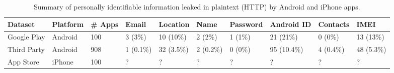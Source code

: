 \begin{table}[t]
    \centering
    \begin{tabular}{l|l|l|l|l|l|l|l|l|l}
       Dataset&Platform&\# Apps&Email&Location&Name&Password&Android ID&Contacts&IMEI\\
       \hline
       \hline
       Google Play&Android&100&3 (3\%)&10 (10\%)&2 (2\%)&1 (1\%)&21 (21\%)&0 (0\%)&13 (13\%)\\
       \hline
       Third Party&Android&908&1 (0.1\%)&32 (3.5\%)&2 (0.2\%)&0 (0\%)&95 (10.4\%)&4 (0.4\%)&48 (5.3\%)\\
       \hline
       App Store&iPhone&100&?&?&?&?&?&?&?\\
    \end{tabular}
    \caption{\label{tbl:pii}Summary of personally identifiable information leaked in plaintext (HTTP) by Android and iPhone apps.}
  \end{table}
  

